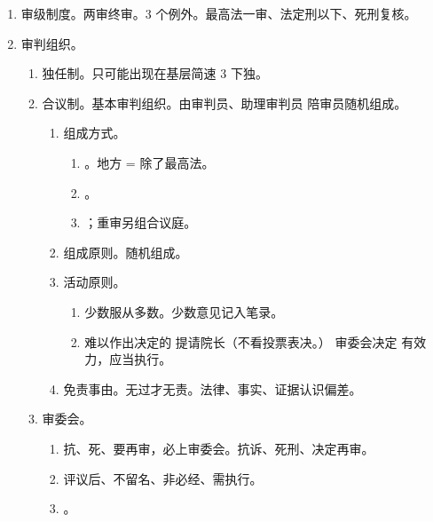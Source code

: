 \begin{enumerate}
\begin{enumerate}
          \item 辩论原则。控辩双方及当事人就事实、证据、程序、法律适用吵架，贯穿始终。
        \end{enumerate}
  \item 审级制度。两审终审。3 个例外。最高法一审、法定刑以下、死刑复核。
  \item 审判组织。
        \begin{enumerate}
          \item 独任制。只可能出现在基层简速 3 下独。
          \item 合议制。基本审判组织。由审判员、助理审判员 \hz 陪审员随机组成。
                \begin{enumerate}
                  \item 组成方式。
                        \begin{enumerate}
                          \item {}。地方 = 除了最高法。
                          \item {}。
                          \item {}；重审另组合议庭。
                        \end{enumerate}
                  \item 组成原则。随机组成。
                  \item 活动原则。
                        \begin{enumerate}
                          \item 少数服从多数。少数意见记入笔录。
                          \item 难以作出决定的 \yjt 提请院长（不看投票表决。） \yjt 审委会决定 \yjt 有效力，应当执行。
                        \end{enumerate}
                  \item 免责事由。无过才无责。法律、事实、证据认识偏差。
                \end{enumerate}
          \item 审委会。
                \begin{enumerate}
                  \item 抗、死、要再审，必上审委会。抗诉、死刑、决定再审。
                  \item 评议后、不留名、非必经、需执行。
                  \item {}。

\end{enumerate}
\end{enumerate}
\end{enumerate}
